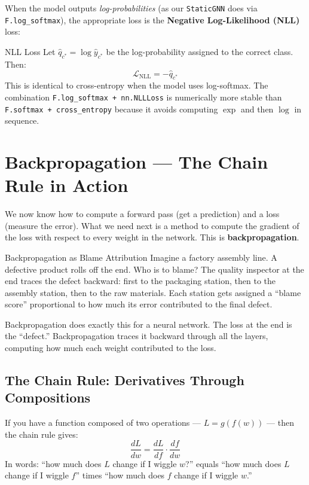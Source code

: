 When the model outputs \emph{log-probabilities} (as our \texttt{StaticGNN} does via \texttt{F.log\_softmax}), the appropriate loss is the \textbf{Negative Log-Likelihood (NLL)} loss:

\begin{mathbox}{NLL Loss}
Let $\hat{q}_{c^*} = \log \hat{y}_{c^*}$ be the log-probability assigned to the correct class. Then:
\begin{equation}
    \mathcal{L}_{\text{NLL}} = -\hat{q}_{c^*}
\end{equation}
This is identical to cross-entropy when the model uses log-softmax. The combination \texttt{F.log\_softmax + nn.NLLLoss} is numerically more stable than \texttt{F.softmax + cross\_entropy} because it avoids computing $\exp$ and then $\log$ in sequence.
\end{mathbox}

\section{Backpropagation --- The Chain Rule in Action}
\label{sec:backprop}

We now know how to compute a forward pass (get a prediction) and a loss (measure the error). What we need next is a method to compute the gradient of the loss with respect to every weight in the network. This is \textbf{backpropagation}.

\begin{analogybox}{Backpropagation as Blame Attribution}
Imagine a factory assembly line. A defective product rolls off the end. Who is to blame? The quality inspector at the end traces the defect backward: first to the packaging station, then to the assembly station, then to the raw materials. Each station gets assigned a ``blame score'' proportional to how much its error contributed to the final defect.

Backpropagation does exactly this for a neural network. The loss at the end is the ``defect.'' Backpropagation traces it backward through all the layers, computing how much each weight contributed to the loss.
\end{analogybox}

\subsection{The Chain Rule: Derivatives Through Compositions}

If you have a function composed of two operations --- $L = g(f(w))$ --- then the chain rule gives:
\begin{equation}
    \frac{dL}{dw} = \frac{dL}{df} \cdot \frac{df}{dw}
\end{equation}
In words: ``how much does $L$ change if I wiggle $w$?'' equals ``how much does $L$ change if I wiggle $f$'' times ``how much does $f$ change if I wiggle $w$.''

